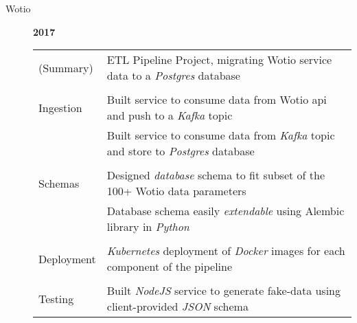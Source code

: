 \documentclass[12pt]{article}
\begin{document}
\begin{description}
\begin{description}
                \item[Wotio] \hfill \textbf{2017}\\
                    \begin{tabular}{l|l}
                        (Summary) & ETL Pipeline Project, migrating Wotio service data to a \textit{Postgres} database\\
				\\[-1.7mm]
                        Ingestion & Built service to consume data from Wotio api and push to a \textit{Kafka} topic\\
                                  & Built service to consume data from \textit{Kafka} topic and store to \textit{Postgres} database\\
				\\[-1.7mm]
                        Schemas   & Designed \textit{database} schema to fit subset of the 100+ Wotio data parameters\\
				  & Database schema easily \textit{extendable} using Alembic library in \textit{Python}\\
				\\[-1.7mm]
                        Deployment& \textit{Kubernetes} deployment of \textit{Docker} images for each component of the pipeline\\
				\\[-1.7mm]
                        Testing   & Built \textit{NodeJS} service to generate fake-data using client-provided \textit{JSON} schema\\
                    \end{tabular}


\end{description}
\end{description}
\end{document}
